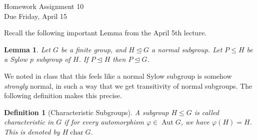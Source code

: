 \documentclass[11pt]{article}
\newtheorem{lemma}{Lemma}
\newtheorem{definition}[theorem]{Definition}
\newcommand{\Aut}{\operatorname{Aut}}
\newcommand{\ch}{\operatorname{char}}
\begin{document}
\begin{center}
\Large {Homework Assignment 10}\\
\small {Due Friday, April 15}
\end{center}
Recall the following important Lemma from the April 5th lecture.
\begin{lemma}\label{LemmaA}
  Let $G$ be a finite group, and $H\unlhd G$ a normal subgroup.  Let $P\le H$ be a Sylow $p$ subgroup of $H$.  If $P\unlhd H$ then $P\unlhd G$.
\end{lemma}
We noted in class that this feels like a normal Sylow subgroup is somehow \textit{strongly} normal, in such a way that we get transitivity of normal subgroups.  The following definition makes this precise.
\begin{definition}[Characteristic Subgroups]
  A subgroup $H\le G$ is called \textit{characteristic} in $G$ if for every automorphism $\varphi\in\Aut G$, we have $\varphi(H) = H$.  This is denoted by $H\ch G$.
\end{definition}
\end{document}
